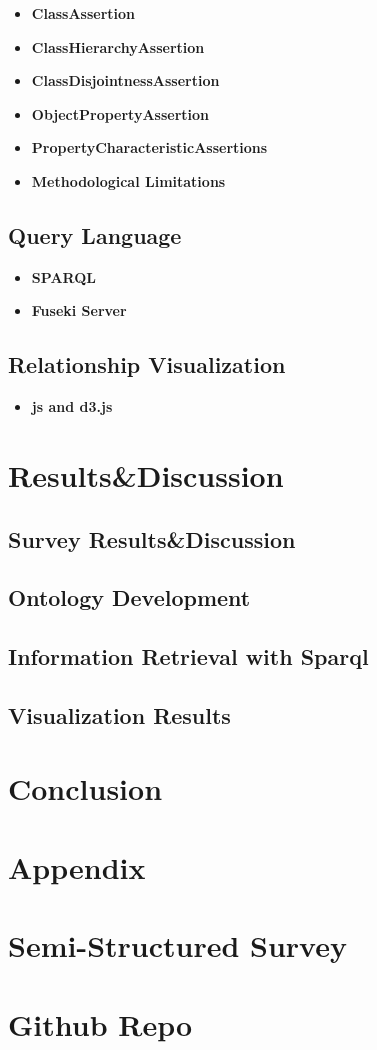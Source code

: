 \documentclass[runningheads]{llncs}
\begin{document}
\begin{itemize}
    \item \textbf{ClassAssertion}
    \item \textbf{ClassHierarchyAssertion}
    \item \textbf{ClassDisjointnessAssertion}
    \item \textbf{ObjectPropertyAssertion}
    \item \textbf{PropertyCharacteristicAssertions}
    \item \textbf{Methodological Limitations}
\end{itemize}

\subsection{Query Language}
\begin{itemize}
    \item \textbf{SPARQL}
    \item \textbf{Fuseki Server}
\end{itemize}
\subsection{Relationship Visualization}
\begin{itemize}
    \item \textbf{js and d3.js}
\end{itemize}

\section{Results\&Discussion}

\subsection{Survey Results\&Discussion}

\subsection{Ontology Development}
\subsection{Information Retrieval with Sparql}
\subsection{Visualization Results}

\section{Conclusion}

\section{Appendix}
\appendix
\section{Semi-Structured Survey}
%
\section{Github Repo}



\end{document}
